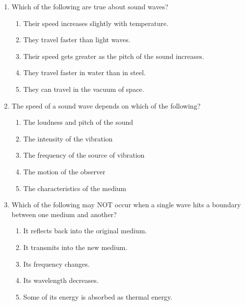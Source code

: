 \documentclass{../../../oss-classkick}
\begin{document}
\begin{multicols}{2}
\begin{enumerate}[leftmargin=18pt,resume]
  \item Which of the following are true about sound waves?
    \label{multi-1st}
    \begin{enumerate}[nosep,leftmargin=18pt,label=(\Alph*)]
    \item Their speed increases slightly with temperature.
    \item They travel faster than light waves.
    \item Their speed gets greater as the pitch of the sound increases.
    \item They travel faster in water than in steel.
    \item They can travel in the vacuum of space.
    \end{enumerate}
    \vspace{.7in}
    
  \item The speed of a sound wave depends on which of the following?
    \begin{enumerate}[nosep,leftmargin=18pt,label=(\Alph*)]
    \item The loudness and pitch of the sound
    \item The intensity of the vibration
    \item The frequency of the source of vibration
    \item The motion of the observer
    \item The characteristics of the medium
    \end{enumerate}
    \vspace{.7in}
    
  \item Which of the following may NOT occur when a single wave hits a boundary
    between one medium and another?
    \begin{enumerate}[nosep,leftmargin=18pt,label=(\Alph*)]
    \item It reflects back into the original medium.
    \item It transmits into the new medium.
    \item Its frequency changes.
    \item Its wavelength decreases.
    \item Some of its energy is absorbed as thermal energy.
    \end{enumerate}
    \vspace{.7in}
    

\end{enumerate}
\end{multicols}
\end{document}
